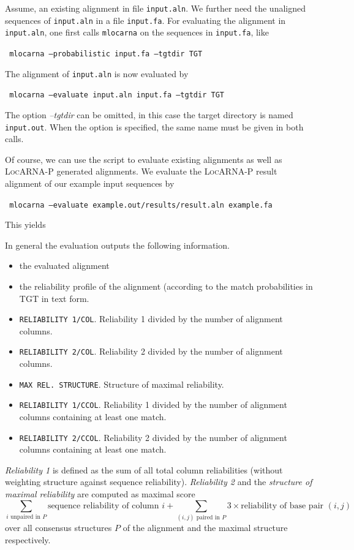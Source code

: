\documentclass{article}
\newcommand{\LocARNAP}{\textsc{LocARNA-P}}
\newenvironment{ttbox}{%
  \begin{framed}\begin{minipage}{1.0\textwidth}\tt}%
{\end{minipage}\end{framed}}
\begin{document}
Assume, an existing alignment in file \texttt{input.aln}. We further
need the unaligned sequences of \texttt{input.aln} in a file
\texttt{input.fa}.  For evaluating the alignment in
\texttt{input.aln}, one first calls \texttt{mlocarna} on the sequences
in \texttt{input.fa}, like
\begin{ttbox}
  mlocarna --probabilistic input.fa --tgtdir TGT
\end{ttbox}
The alignment of \texttt{input.aln} is now evaluated by
\begin{ttbox}
  mlocarna --evaluate input.aln input.fa --tgtdir TGT
\end{ttbox}
The option \emph{--tgtdir} can be omitted, in this case the target
directory is named \texttt{input.out}. When the option is specified,
the same name must be given in both calls.

Of course, we can use the script to evaluate existing alignments as
well as \LocARNAP{} generated alignments. We evaluate the \LocARNAP{}
result alignment of our example input sequences by
\begin{ttbox}
  mlocarna --evaluate example.out/results/result.aln example.fa
\end{ttbox}
This yields
\begin{framed}
  
\end{framed}

In general the evaluation outputs the following information.
\begin{itemize}
  \item the evaluated alignment
  \item the reliability profile of the alignment (according to the
    match probabilities in TGT in text form.
  \item \texttt{RELIABILITY 1/COL}. Reliability 1 divided by the number of alignment columns.
  \item \texttt{RELIABILITY 2/COL}. Reliability 2 divided by the number of alignment columns.
  \item \texttt{MAX REL. STRUCTURE}. Structure of maximal reliability.
  \item \texttt{RELIABILITY 1/CCOL}. Reliability 1 divided by the
    number of alignment columns containing at least one match.
  \item \texttt{RELIABILITY 2/CCOL}. Reliability 2 divided by the number of alignment columns containing at least one match.
\end{itemize}
\emph{Reliability 1} is defined as the sum of all total column
reliabilities (without weighting structure against sequence
reliability). \emph{Reliability 2} and the \emph{structure of maximal
  reliability} are computed as maximal score
\begin{displaymath}
  \sum_{\text{$i$ unpaired in $P$}} \text{sequence reliability of column $i$} + \sum_{\text{$(i,j)$ paired in $P$}} 3\times\text{reliability of base pair $(i,j)$}
\end{displaymath}
over all consensus structures $P$ of the alignment and the maximal
structure respectively.
\end{document}
